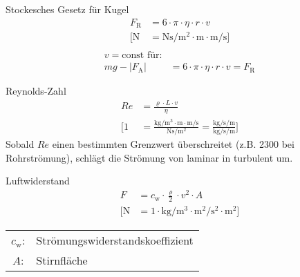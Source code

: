 \begin{karte}{Stockesches Gesetz für Kugel}
    \begin{align*}
        F_\text{R} &= 6 \cdot \pi \cdot \eta \cdot r \cdot v \\
        \bigg[ \si{\newton} &= \si{\newton\second\per\square\meter} \cdot \si{\meter} \cdot\si{\meter\per\second} \bigg] \\
    \end{align*}
    \begin{align*}
        v = \text{const für:}& \\
        mg - \left| F_\text{A} \right| &= 6 \cdot \pi \cdot \eta \cdot r \cdot v = F_\text{R}
    \end{align*}
\end{karte}

\begin{karte}{Reynolds-Zahl}
    \begin{align*}
        \mathit{Re} &= \frac{\varrho \cdot L \cdot v}{\eta} \\
        \Bigg[ 1 &= \frac{\si{\kilogram\per\cubic\meter} \cdot \si{\meter} \cdot \si{\meter\per\second}}{\si{\newton\second\per\square\meter}} 
            = \frac{\si{\kilogram\per\second\per\meter}}{\si{\kilogram \per\second\per\meter }}
            \Bigg]
    \end{align*}
    Sobald \(\mathit{Re}\) einen bestimmten Grenzwert über\-schreitet (z.B. 2300 bei Rohrströmung), schlägt die Strömung von laminar in turbulent um.
\end{karte}

\begin{karte}{Luftwiderstand}
    \begin{align*}
        F &=  c_\mathrm w \cdot \frac{\varrho}{2} \cdot v^2 \cdot A \\
        \bigg[ \si{\newton} &= 1 \cdot \si{\kilogram\per\cubic\meter} \cdot \si{\square\meter\per\square\second} \cdot \si{\square\meter} \bigg]
    \end{align*}
     \begin{tabular}[t]{cl}
         \(c_\mathrm w\):& Strömungswiderstandskoeffizient \\
         \(A\): &Stirnfläche
     \end{tabular}

\end{karte}

